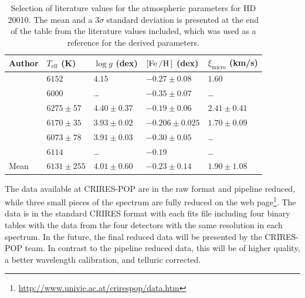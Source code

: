\begin{table}[htb!]
    \caption{Selection of literature values for the atmospheric parameters for HD 20010. The mean
             and a $3 \sigma$ standard deviation is presented at the end of the table from the
             literature values included, which was used as a reference for the derived parameters.}
    \label{tab:HD20010}
    \centering
    \begin{tabular}{l|llll}
      \hline\hline
     Author                 & $T_\mathrm{eff}$ (K) & $\log g$ (dex)  & $[\ion{Fe}/\ion{H}]$ (dex)  & $\xi_\mathrm{micro}$ (km/s)  \\
      \hline
    \cite{Balachandran1990} & $6152$               & $4.15$          & $-0.27 \pm0.08$             & $1.60$                       \\
    \cite{Favata1997}       & $6000$               & \ldots          & $-0.35 \pm0.07$             & \ldots                       \\
    \cite{Santos2004}       & $6275\pm57$          & $4.40\pm0.37$   & $-0.19 \pm0.06$             & $2.41\pm0.41$                \\
    \cite{Gonzalez2010}     & $6170\pm35$          & $3.93\pm0.02$   & $-0.206\pm0.025$            & $1.70\pm0.09$                \\
    \cite{Ramirez2012}      & $6073\pm78$          & $3.91\pm0.03$   & $-0.30 \pm0.05$             & \ldots                       \\
    \cite{Mortier2013}      & $6114$               & \ldots          & $-0.19$                     & \ldots                       \\
      \hline
      Mean                  & $6131\pm255$         & $4.01\pm0.60$   & $-0.23 \pm0.14$             & $1.90\pm1.08$                \\
      \hline
    \end{tabular}
\end{table}

The data available at CRIRES-POP are in the raw format and pipeline reduced, while three small
pieces of the spectrum are fully reduced on the web
page\footnote{\url{http://www.univie.ac.at/crirespop/data.htm}}. The data is in the standard CRIRES
format with each fits file including four binary tables with the data from the four detectors with
the same resolution in each spectrum. In the future, the final reduced data will be presented by the
CRIRES-POP team. In contrast to the pipeline reduced data, this will be of higher quality, a better
wavelength calibration, and telluric corrected.

